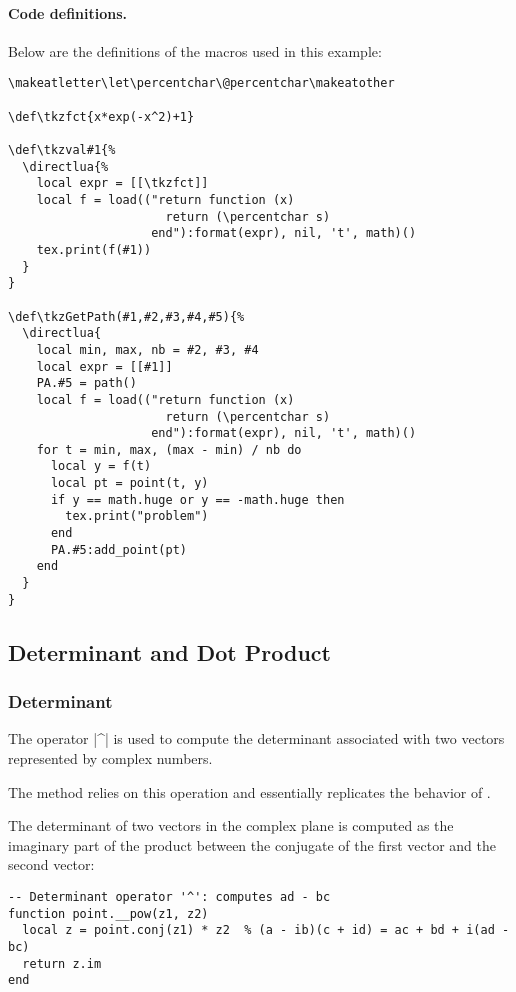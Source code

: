 \paragraph{Code definitions.}
Below are the definitions of the macros used in this example:

\begin{verbatim}
\makeatletter\let\percentchar\@percentchar\makeatother

\def\tkzfct{x*exp(-x^2)+1}

\def\tkzval#1{%
  \directlua{%
    local expr = [[\tkzfct]]
    local f = load(("return function (x)
                      return (\percentchar s) 
                    end"):format(expr), nil, 't', math)()
    tex.print(f(#1))
  }
}

\def\tkzGetPath(#1,#2,#3,#4,#5){%
  \directlua{
    local min, max, nb = #2, #3, #4
    local expr = [[#1]]
    PA.#5 = path()
    local f = load(("return function (x)
                      return (\percentchar s) 
                    end"):format(expr), nil, 't', math)()
    for t = min, max, (max - min) / nb do
      local y = f(t)
      local pt = point(t, y)
      if y == math.huge or y == -math.huge then 
        tex.print("problem") 
      end
      PA.#5:add_point(pt)
    end
  }
}
\end{verbatim}



\subsection{Determinant and Dot Product} %
\label{sub:determinant_et_produit_scalaire}

\subsubsection{Determinant} %
\label{ssub:determinant}

The operator |^| is used to compute the determinant associated with two vectors represented by complex numbers.

The  method relies on this operation and essentially replicates the behavior of .

The determinant of two vectors in the complex plane is computed as the imaginary part of the product between the conjugate of the first vector and the second vector:

\begin{verbatim}
-- Determinant operator '^': computes ad - bc
function point.__pow(z1, z2)
  local z = point.conj(z1) * z2  % (a - ib)(c + id) = ac + bd + i(ad - bc)
  return z.im
end
\end{verbatim}


